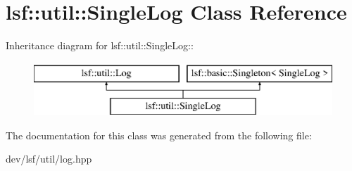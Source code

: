 \hypertarget{classlsf_1_1util_1_1SingleLog}{
\section{lsf::util::SingleLog Class Reference}
\label{classlsf_1_1util_1_1SingleLog}
}
Inheritance diagram for lsf::util::SingleLog::\begin{figure}[H]
\begin{center}
\leavevmode
\includegraphics[height=2cm]{classlsf_1_1util_1_1SingleLog}
\end{center}
\end{figure}


The documentation for this class was generated from the following file:\begin{DoxyCompactItemize}
\item 
dev/lsf/util/log.hpp\end{DoxyCompactItemize}
